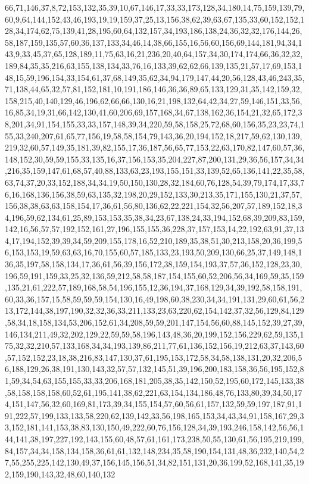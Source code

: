 \documentclass[11pt]{article}
\begin{document}
\begin{vncode}
66,71,146,37,8,72,153,132,35,39,10,67,146,17,33,33,173,128,34,180,14,75,159,139,79,60,9,64,144,152,43,46,193,19,19,159,37,25,13,156,38,62,39,63,67,135,33,60,152,152,128,34,174,62,75,139,41,28,195,60,64,132,157,34,193,186,138,24,36,32,32,176,144,26,58,187,159,135,57,60,36,137,133,34,46,14,38,66,155,16,56,60,156,69,144,181,94,34,143,9,33,45,37,65,128,189,11,75,63,16,21,236,20,40,64,157,34,30,174,174,66,36,32,32,189,84,35,35,216,63,155,138,134,33,76,16,133,39,62,62,66,139,135,21,57,17,69,153,148,15,59,196,154,33,154,61,37,68,149,35,62,34,94,179,147,44,20,56,128,43,46,243,35,71,138,44,65,32,57,81,152,181,10,191,186,146,36,36,89,65,133,129,31,35,142,159,32,158,215,40,140,129,46,196,62,66,66,130,16,21,198,132,64,42,34,27,59,146,151,33,56,16,85,34,19,31,66,142,130,41,60,206,69,157,168,34,67,138,162,36,154,21,32,65,172,38,201,34,91,154,155,33,33,157,148,39,34,220,59,58,158,25,72,68,60,156,35,23,23,74,155,33,240,207,61,65,77,156,19,58,58,154,79,143,36,20,194,152,18,217,59,62,130,139,219,32,60,57,149,35,181,39,82,155,17,36,187,56,65,77,153,22,63,170,82,147,60,57,36,148,152,30,59,59,155,33,135,16,37,156,153,35,204,227,87,200,131,29,36,56,157,34,34,216,35,159,147,61,68,57,40,88,133,63,23,193,155,151,33,139,52,65,136,141,22,35,58,63,74,37,20,33,152,188,34,34,19,50,150,130,28,32,184,60,76,128,54,39,79,174,17,33,76,16,168,136,156,38,59,63,135,32,198,20,29,152,133,30,213,35,171,155,130,21,37,57,156,38,38,63,63,158,154,17,36,61,56,80,136,62,22,221,154,32,56,207,57,189,152,18,34,196,59,62,134,61,25,89,153,153,35,38,34,23,67,138,24,33,194,152,68,39,209,83,159,142,16,56,57,57,192,152,161,27,196,155,155,36,228,37,157,153,14,22,192,63,91,37,134,17,194,152,39,39,34,59,209,155,178,16,52,210,189,35,38,51,30,213,158,20,36,199,56,153,153,19,59,63,63,16,70,155,60,57,185,133,23,193,50,209,130,66,25,37,149,148,136,35,197,58,158,134,17,36,61,56,39,156,172,38,159,154,193,37,57,36,152,128,23,30,196,59,191,159,33,25,32,136,59,212,58,58,187,154,155,60,52,206,56,34,169,59,35,159,135,21,61,222,57,189,168,58,54,196,155,12,36,194,37,168,129,34,39,192,58,158,191,60,33,36,157,15,58,59,59,59,154,130,16,49,198,60,38,230,34,34,191,131,29,60,61,56,213,172,144,38,197,190,32,32,36,33,211,133,23,63,220,62,154,142,37,32,56,129,84,129,58,34,18,158,134,53,206,152,61,34,208,59,59,201,147,154,56,60,88,145,152,39,27,39,146,134,211,49,32,202,129,22,59,59,58,196,143,48,36,20,199,152,156,229,62,59,135,175,32,32,210,57,133,168,34,34,193,139,86,211,77,61,136,152,156,19,212,63,37,143,60,57,152,152,23,18,38,216,83,147,130,37,61,195,153,172,58,34,58,138,131,20,32,206,56,188,129,26,38,191,130,143,32,57,57,132,145,51,39,196,200,183,158,36,56,195,152,81,59,34,54,63,155,155,33,33,206,168,181,205,38,35,142,150,52,195,60,172,145,133,38,58,158,158,158,60,52,61,195,141,38,62,221,63,154,134,186,48,76,133,80,39,34,50,174,151,147,56,32,60,169,81,173,39,34,155,154,57,60,56,61,157,132,59,59,197,187,91,191,222,57,199,133,133,58,220,62,139,142,33,56,198,165,153,34,43,34,91,158,167,29,33,152,181,141,153,38,83,130,150,49,222,60,76,156,128,34,39,193,246,158,142,56,56,144,141,38,197,227,192,143,155,60,48,57,61,161,173,238,50,55,130,61,56,195,219,199,84,157,34,34,158,134,158,36,61,61,132,148,234,35,58,190,154,131,48,36,232,140,54,27,55,255,225,142,130,49,37,156,145,156,51,34,82,151,131,20,36,199,52,168,141,35,192,159,190,143,32,48,60,140,132
\end{vncode}
\end{document}

